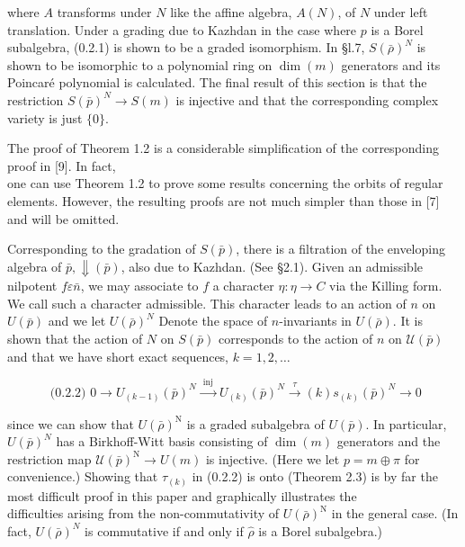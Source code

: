 \documentclass[10pt]{article}
\begin{document}
where $A$ transforms under $N$ like the affine algebra, $A(N)$, of $N$ under left translation. Under a grading due to Kazhdan in the case where $p$ is a Borel subalgebra, (0.2.1) is shown to be a graded isomorphism. In §l.7, $S(\bar{\rho})^{N}$ is shown to be isomorphic to a polynomial ring on $\operatorname{dim}(m)$ generators and its Poincaré polynomial is calculated. The final result of this section is that the restriction $S(\bar{p})^{N} \rightarrow S(m)$ is injective and that the corresponding complex variety is just $\{0\}$.

The proof of Theorem 1.2 is a considerable simplification of the corresponding proof in [9]. In fact,\\[0pt]
one can use Theorem 1.2 to prove some results concerning the orbits of regular elements. However, the resulting proofs are not much simpler than those in [7] and will be omitted.

Corresponding to the gradation of $S(\bar{p})$, there is a filtration of the enveloping algebra of $\bar{p}, \Downarrow(\bar{p})$, also due to Kazhdan. (See §2.1). Given an admissible nilpotent $f \varepsilon \bar{n}$, we may associate to $f$ a character $\eta: \eta \rightarrow C$ via the Killing form. We call such a character admissible. This character leads to an action of $n$ on $U(\bar{p})$ and we let $U(\bar{\rho})^{N}$ Denote the space of $n$-invariants in $U(\bar{\rho})$. It is shown that the action of $N$ on $S(\bar{p})$ corresponds to the action of $n$ on $\mathcal{U}(\bar{p})$ and that we have short exact sequences, $k=1,2, \ldots$

$$
\text { (0.2.2) } 0 \rightarrow U_{(k-1)}(\bar{p})^{N} \xrightarrow{\text { inj }} U_{(k)}(\bar{p})^{N} \xrightarrow{\tau}(k) s_{(k)}(\bar{p})^{N} \rightarrow 0
$$

since we can show that $U(\bar{\rho})^{\mathrm{N}}$ is a graded subalgebra of $U(\bar{p})$. In particular, $U(\bar{p})^{N}$ has a Birkhoff-Witt basis consisting of $\operatorname{dim}(m)$ generators and the restriction map $\mathcal{U}(\bar{p})^{\mathrm{N}} \rightarrow U(m)$ is injective. (Here we let $p=m \oplus \pi$ for convenience.) Showing that $\tau_{(k)}$ in (0.2.2) is onto (Theorem 2.3) is by far the most difficult proof in this paper and graphically illustrates the\\
difficulties arising from the non-commutativity of $U(\bar{\rho})^{\mathrm{N}}$ in the general case. (In fact, $U(\bar{\rho})^{N}$ is commutative if and only if $\hat{\rho}$ is a Borel subalgebra.)
\end{document}
